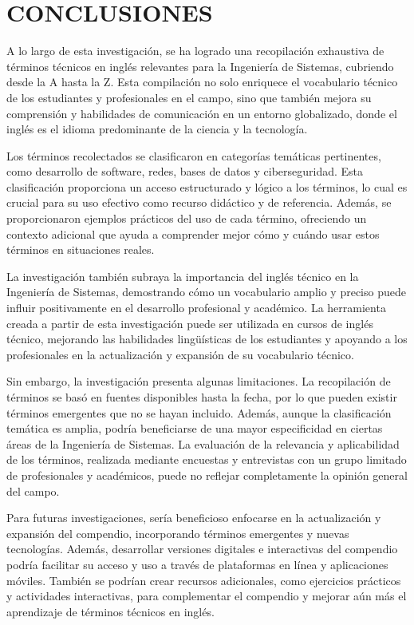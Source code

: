 \section{CONCLUSIONES}
A lo largo de esta investigación, se ha logrado una recopilación exhaustiva de términos técnicos en inglés relevantes para la Ingeniería de Sistemas, cubriendo desde la A hasta la Z. Esta compilación no solo enriquece el vocabulario técnico de los estudiantes y profesionales en el campo, sino que también mejora su comprensión y habilidades de comunicación en un entorno globalizado, donde el inglés es el idioma predominante de la ciencia y la tecnología. \newline

Los términos recolectados se clasificaron en categorías temáticas pertinentes, como desarrollo de software, redes, bases de datos y ciberseguridad. Esta clasificación proporciona un acceso estructurado y lógico a los términos, lo cual es crucial para su uso efectivo como recurso didáctico y de referencia. Además, se proporcionaron ejemplos prácticos del uso de cada término, ofreciendo un contexto adicional que ayuda a comprender mejor cómo y cuándo usar estos términos en situaciones reales. \newline

La investigación también subraya la importancia del inglés técnico en la Ingeniería de Sistemas, demostrando cómo un vocabulario amplio y preciso puede influir positivamente en el desarrollo profesional y académico. La herramienta creada a partir de esta investigación puede ser utilizada en cursos de inglés técnico, mejorando las habilidades lingüísticas de los estudiantes y apoyando a los profesionales en la actualización y expansión de su vocabulario técnico. \newline

Sin embargo, la investigación presenta algunas limitaciones. La recopilación de términos se basó en fuentes disponibles hasta la fecha, por lo que pueden existir términos emergentes que no se hayan incluido. Además, aunque la clasificación temática es amplia, podría beneficiarse de una mayor especificidad en ciertas áreas de la Ingeniería de Sistemas. La evaluación de la relevancia y aplicabilidad de los términos, realizada mediante encuestas y entrevistas con un grupo limitado de profesionales y académicos, puede no reflejar completamente la opinión general del campo. \newline

Para futuras investigaciones, sería beneficioso enfocarse en la actualización y expansión del compendio, incorporando términos emergentes y nuevas tecnologías. Además, desarrollar versiones digitales e interactivas del compendio podría facilitar su acceso y uso a través de plataformas en línea y aplicaciones móviles. También se podrían crear recursos adicionales, como ejercicios prácticos y actividades interactivas, para complementar el compendio y mejorar aún más el aprendizaje de términos técnicos en inglés. \newline

